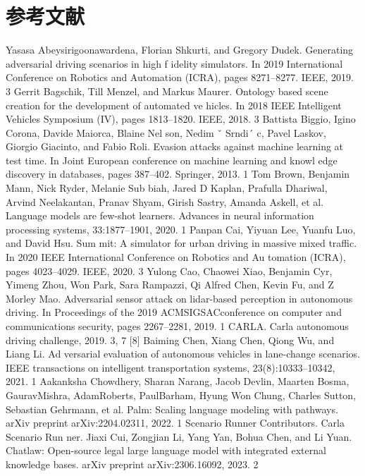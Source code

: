 \documentclass{article}
\begin{document}
\section{参考文献}
\begin{thebibliography}{99}
	Yasasa Abeysirigoonawardena, Florian Shkurti, and Gregory Dudek. Generating adversarial driving scenarios in high f idelity simulators. In 2019 International Conference on Robotics and Automation (ICRA), pages 8271–8277. IEEE, 2019. 3
	Gerrit Bagschik, Till Menzel, and Markus Maurer. Ontology based scene creation for the development of automated ve hicles. In 2018 IEEE Intelligent Vehicles Symposium (IV), pages 1813–1820. IEEE, 2018. 3 
	Battista Biggio, Igino Corona, Davide Maiorca, Blaine Nel son, Nedim ˇ Srndi´ c, Pavel Laskov, Giorgio Giacinto, and Fabio Roli. Evasion attacks against machine learning at test time. In Joint European conference on machine learning and knowl edge discovery in databases, pages 387–402. Springer, 2013. 1 
	Tom Brown, Benjamin Mann, Nick Ryder, Melanie Sub biah, Jared D Kaplan, Prafulla Dhariwal, Arvind Neelakantan, Pranav Shyam, Girish Sastry, Amanda Askell, et al. Language models are few-shot learners. Advances in neural information processing systems, 33:1877–1901, 2020. 1 
	Panpan Cai, Yiyuan Lee, Yuanfu Luo, and David Hsu. Sum mit: A simulator for urban driving in massive mixed traffic. In 2020 IEEE International Conference on Robotics and Au tomation (ICRA), pages 4023–4029. IEEE, 2020. 3 
	Yulong Cao, Chaowei Xiao, Benjamin Cyr, Yimeng Zhou, Won Park, Sara Rampazzi, Qi Alfred Chen, Kevin Fu, and Z Morley Mao. Adversarial sensor attack on lidar-based perception in autonomous driving. In Proceedings of the 2019 ACMSIGSACconference on computer and communications security, pages 2267–2281, 2019. 1 
	CARLA. Carla autonomous driving challenge, 2019. 3, 7 [8] Baiming Chen, Xiang Chen, Qiong Wu, and Liang Li. Ad versarial evaluation of autonomous vehicles in lane-change scenarios. IEEE transactions on intelligent transportation systems, 23(8):10333–10342, 2021. 1 
	Aakanksha Chowdhery, Sharan Narang, Jacob Devlin, Maarten Bosma, GauravMishra, AdamRoberts, PaulBarham, Hyung Won Chung, Charles Sutton, Sebastian Gehrmann, et al. Palm: Scaling language modeling with pathways. arXiv preprint arXiv:2204.02311, 2022. 1
	Scenario Runner Contributors. Carla Scenario Run ner.  
	Jiaxi Cui, Zongjian Li, Yang Yan, Bohua Chen, and Li Yuan. Chatlaw: Open-source legal large language model with integrated external knowledge bases. arXiv preprint arXiv:2306.16092, 2023. 2

\end{thebibliography}
\end{document}

